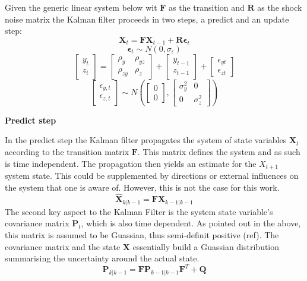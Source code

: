 \documentclass[12pt,a4paper,english]{article} %
\newcommand{\matr}[1]{\mathbf{#1}} %
\begin{document}
	Given the generic linear system below wit $\matr{F}$ as the transition and $\matr R$ as the shock noise matrix the Kalman filter proceeds in two steps, a predict and an update step:\\
	\[
		\matr{X}_t = \matr F \matr{X}_{t-1} + \matr R \matr{\epsilon}_t
	\]
	\[
	\matr{\epsilon}_t \sim N(0, \sigma_{\epsilon})
	\]	
	\[
			\begin{bmatrix}
				y_t \\
				z_t
			\end{bmatrix}
		=
			\begin{bmatrix}
				\rho_y & \rho_{yz} \\
				\rho_{zy} & \rho_z
			\end{bmatrix}
		+
			\begin{bmatrix}
				y_{t-1} \\
				z_{t-1}
			\end{bmatrix}
		+
			\begin{bmatrix}
				\epsilon_{yt} \\
				\epsilon_{zt}
			\end{bmatrix}				
	\]
	\[
		\begin{bmatrix}
			\epsilon_{y,t} \\
			\epsilon_{z, t}
		\end{bmatrix}
		\sim
		N
		\left(
			\begin{bmatrix}
				0 \\
				0
			\end{bmatrix}
		,
			\begin{bmatrix}
				\sigma_y^2 & 0 \\
				0 & \sigma_z^2
			\end{bmatrix}
		\right)
	\]
		
	\textbf{Predict step}
	
	In the predict step the Kalman filter propagates the system of state variables $\matr X_{t}$ according to the transition matrix $\matr F$. This matrix defines the system and as such is time independent. The propagation then yields an estimate for the $X_{t+1}$ system state. This could be supplemented by directions or external influences on the system that one is aware of. However, this is not the case for this work.
	\[
		\matr{\hat{X}}_{k|k-1} = \matr F \matr X_{k-1|k-1}
	\]
	The second key aspect to the Kalman Filter is the system state variable's covariance matrix $\matr P_{t}$, which is also time dependent. As pointed out in the above, this matrix is assumed to be Guassian, thus semi-definit positive (ref). The covariance matrix and the state $\matr X$ essentially build a Guassian distribution summarising the uncertainty around the actual state.
	\[
		\matr{P}_{k| k-1} = \matr F \matr{P}_{k-1| k-1} \matr{F}^T + \matr Q
	\]
	
\end{document}
